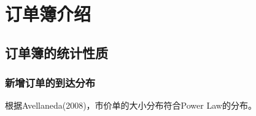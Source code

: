 \chapter{订单簿介绍}
\section{订单簿的统计性质}
\subsection{新增订单的到达分布}
根据Avellaneda(2008)，市价单的大小分布符合Power Law的分布。